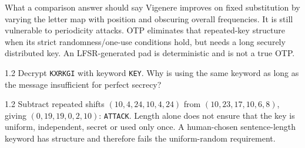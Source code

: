 \documentclass[11pt,a4paper]{article}
\begin{document}
\begin{tip}{What a comparison answer should say}
Vigenere improves on fixed substitution by varying the letter map with position and obscuring overall frequencies. It is still vulnerable to periodicity attacks. OTP eliminates that repeated-key structure when its strict randomness/one-use conditions hold, but needs a long securely distributed key. An LFSR-generated pad is deterministic and is not a true OTP.
\end{tip}
\begin{question}{1.2}
Decrypt \texttt{KXRKGI} with keyword \texttt{KEY}. Why is using the same keyword as long as the message insufficient for perfect secrecy?
\end{question}
\begin{answer}{1.2}
Subtract repeated shifts \((10,4,24,10,4,24)\) from \((10,23,17,10,6,8)\), giving \((0,19,19,0,2,10)\): \texttt{ATTACK}. Length alone does not ensure that the key is uniform, independent, secret or used only once. A human-chosen sentence-length keyword has structure and therefore fails the uniform-random requirement.
\end{answer}
\end{document}
